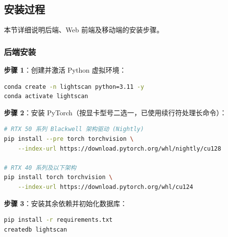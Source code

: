\documentclass[UTF8, a4paper, fontset=ubuntu]{ctexart}
\begin{document}
\begin{table}[H]
\centering
\caption{运行环境要求}
\label{tab:env_requirements}
\end{table}

\subsection{安装过程}
本节详细说明后端、Web 前端及移动端的安装步骤。

\subsubsection{后端安装}

\noindent\textbf{步骤 1}：创建并激活 Python 虚拟环境：
\begin{lstlisting}[language=bash]
conda create -n lightscan python=3.11 -y
conda activate lightscan
\end{lstlisting}

\noindent\textbf{步骤 2}：安装 PyTorch（按显卡型号二选一，已使用续行符处理长命令）：
\begin{lstlisting}[language=bash]
# RTX 50 系列 Blackwell 架构驱动 (Nightly)
pip install --pre torch torchvision \
    --index-url https://download.pytorch.org/whl/nightly/cu128

# RTX 40 系列及以下架构
pip install torch torchvision \
    --index-url https://download.pytorch.org/whl/cu124
\end{lstlisting}

\noindent\textbf{步骤 3}：安装其余依赖并初始化数据库：
\begin{lstlisting}[language=bash]
pip install -r requirements.txt
createdb lightscan
\end{lstlisting}
\end{document}
